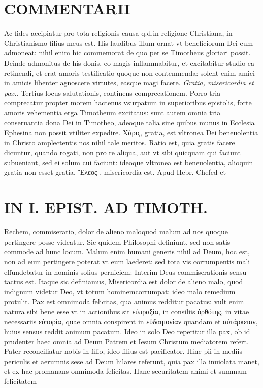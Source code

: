 \documentclass{article}
\begin{document}
\begin{pages}
\section*{COMMENTARII }
\marginpar{[ p.14 ]}\pstart Ac fides accipiatur pro tota religionis causa q.d.in religione Christiana, in Christianismo filius meus est.  \pend\pstart His laudibus illum ornat vt beneficiorum Dei eum admoneat: nihil enim hic commemorat de quo per se Timotheus gloriari possit. Deinde admonitus de his donis, eo magis inflammabitur, et excitabitur studio ea retinendi, et erat amoris testificatio quoque non contemnenda: solent enim amici in amicis libenter agnoscere virtutes, easque magi facere.  \pend
\textit{Gratia, misericordia et pax.. }\pstart Tertius locus salutationis, continens comprecationem. Porro tria comprecatur propter morem hactenus vsurpatum in superioribus epistolis, forte amoris vehementia erga Timotheum excitatus: sunt autem omnia tria conseruantia dona Dei in Timotheo, adeoque talia sine quibus munus in Ecclesia Ephesina non possit vtiliter expedire.  \pend\pstart Xάρις, gratia, est vltronea Dei beneuolentia in Christo amplectentis nos nihil tale meritos. Ratio est, quia gratis facere dicuntur, quando rogati, non pro re aliqua, aut vt sibi quicquam qui faciunt subueniant, sed ei solum cui faciunt: ideoque vltronea est beneuolentia, alioquin gratia non esset gratia. Ἔλεος , misericordia est. Apud Hebr. Chefed et  \pend
\section*{IN I. EPIST. AD TIMOTH. }
\marginpar{[ p.15 ]}\pstart Rechem, commiseratio, dolor de alieno maloquod malum ad nos quoque pertingere posse videatur. Sic quidem Philosophi definiunt, sed non satis commode ad hunc locum. Malum enim humani generis nihil ad Deum, hoc est, non ad eum pertingere poterat vt eum laederet: sed tota vis corrumpentis mali effundebatur in hominis solius perniciem: Interim Deus commiserationis sensu tactus est. Itaque sic definiamus, Misericordia est dolor de alieno malo, quod indignum videtur Deo, vt totum hominemcorrumpat: ideo malo remedium protulit.  \pend\pstart Pax est omnimoda felicitas, qua animus redditur pacatus: vult enim natura sibi bene esse vt in actionibus sit εὐπραξία, in consiliis ὀρθότης, in vitae necessariis εὐπορία, quae omnia conspirent in εὐδαιμονίαν quandam et αὐτάρκειαν, huius sensus reddit animum pacatum. Ideo in solo Deo reperitur illa pax, ob id prudenter haec omnia ad Deum Patrem et Iesum Christum mediatorem refert. Pater reconciliatur nobis in filio, ideo filius est pacificator. Hinc pii in mediis periculis et aerumnis sese ad Deum hilares referunt, quia pax illa inuiolata manet, et ex hac promanans omnimoda felicitas.  \pend\pstart Hanc securitatem animi et summam felicitatem  \pend

\end{pages}
\end{document}

